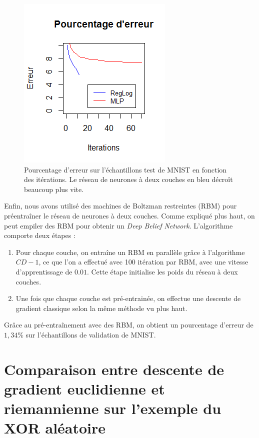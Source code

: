 \documentclass{article}
\theoremstyle{definition}
\begin{document}
\begin{figure}[h!]\centering
\includegraphics[scale=0.6]{Pourcentage.png}
\caption{Pourcentage d'erreur sur l'échantillons test de MNIST en fonction des itérations. Le réseau de neurones à deux couches en bleu décroît beaucoup plus vite.}
\label{fig:Erreur}
\end{figure}

Enfin, nous avons utilisé des machines de Boltzman restreintes (RBM) pour préentraîner le réseau de neurones à deux couches. Comme expliqué plus haut, on peut empiler des RBM pour obtenir un \textit{Deep Belief Network}. L'algorithme comporte deux étapes :
\begin{enumerate}
\item Pour chaque couche, on entraîne un RBM en parallèle grâce à l'algorithme $CD-1$, ce que l'on a effectué avec 100 itération par RBM, avec une vitesse d'apprentissage de $0.01$. Cette étape initialise les poids du réseau à deux couches.
\item Une fois que chaque couche est pré-entrainée, on effectue une descente de gradient classique selon la même méthode vu plus haut.
\end{enumerate}

Grâce au pré-entraînement avec des RBM, on obtient un pourcentage d'erreur de $1,34 \%$ sur l'échantillons de validation de MNIST.


\section{Comparaison entre descente de gradient euclidienne et riemannienne sur l'exemple du XOR aléatoire}
\end{document}

